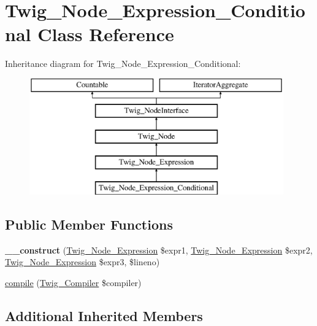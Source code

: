 \hypertarget{class_twig___node___expression___conditional}{}\section{Twig\+\_\+\+Node\+\_\+\+Expression\+\_\+\+Conditional Class Reference}
\label{class_twig___node___expression___conditional}
Inheritance diagram for Twig\+\_\+\+Node\+\_\+\+Expression\+\_\+\+Conditional\+:\begin{figure}[H]
\begin{center}
\leavevmode
\includegraphics[height=5.000000cm]{class_twig___node___expression___conditional}
\end{center}
\end{figure}
\subsection*{Public Member Functions}
\begin{DoxyCompactItemize}
\item 
\hypertarget{class_twig___node___expression___conditional_acbdd637878c47a7554a99e48d8cdac21}{}{\bfseries \+\_\+\+\_\+construct} (\hyperlink{class_twig___node___expression}{Twig\+\_\+\+Node\+\_\+\+Expression} \$expr1, \hyperlink{class_twig___node___expression}{Twig\+\_\+\+Node\+\_\+\+Expression} \$expr2, \hyperlink{class_twig___node___expression}{Twig\+\_\+\+Node\+\_\+\+Expression} \$expr3, \$lineno)\label{class_twig___node___expression___conditional_acbdd637878c47a7554a99e48d8cdac21}

\item 
\hyperlink{class_twig___node___expression___conditional_a4e0faa87c3fae583620b84d3607085da}{compile} (\hyperlink{class_twig___compiler}{Twig\+\_\+\+Compiler} \$compiler)
\end{DoxyCompactItemize}
\subsection*{Additional Inherited Members}


